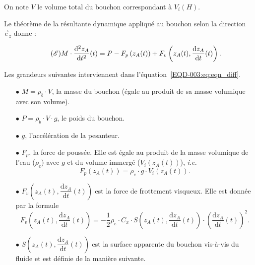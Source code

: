 On note $V$ le volume total du bouchon correspondant à $V_i(H)$.

Le théorème de la résultante dynamique appliqué au bouchon selon la direction $\overrightarrow{e}_z$ donne : 

\begin{equation}\tag{$\mathscr{E}$}\label{EQD-003:eq:eqn_diff}
M\cdot \dfrac{\mathrm{d}^2z_A}{\mathrm{d}t^2}(t)=P-F_p\left(z_A(t)\right)+F_v\left(z_A(t),\dfrac{\mathrm{d}z_A}{\mathrm{d}t}(t)\right).
\end{equation}



Les grandeurs suivantes interviennent dans l'équation~\eqref{EQD-003:eq:eqn_diff}.
\begin{itemize}
\item[$\bullet$] $M=\rho_b\cdot V$, la masse du bouchon (égale au produit de sa masse volumique avec son volume).
\item[$\bullet$] $P=\rho_b\cdot V\cdot g$, le poids du bouchon.
\item[$\bullet$] $g$, l'accélération de la pesanteur.
\item[$\bullet$] $F_p$, la force de poussée. Elle est égale au produit de la masse volumique de l'eau ($\rho_e$) avec $g$ et du volume immergé ($V_i(z_A(t))$), \emph{i.e.}  
\begin{equation*}
F_p(z_A(t))=\rho_e\cdot g\cdot V_i(z_A(t)).
\end{equation*}
\item[$\bullet$] $F_v\left(z_A(t),\dfrac{\mathrm{d}z_A}{\mathrm{d}t}(t)\right)$ est la force de frottement visqueux. Elle est donnée par la formule 
\begin{equation*}
    F_v\left(z_A(t),\dfrac{\mathrm{d}z_A}{\mathrm{d}t}(t)\right)=-\dfrac{1}{2}\rho_e\cdot C_x\cdot S\left(z_A(t),\dfrac{\mathrm{d}z_A}{\mathrm{d}t}(t)\right)\cdot \left(\dfrac{\mathrm{d}z_A}{\mathrm{d}t}(t)\right)^2.
\end{equation*}

% 
\item[$\bullet$] $S\left(z_A(t),\dfrac{\mathrm{d}z_A}{\mathrm{d}t}(t)\right)$ est la surface apparente du bouchon vis-à-vis du fluide et est définie de la manière suivante. 


\end{itemize}

